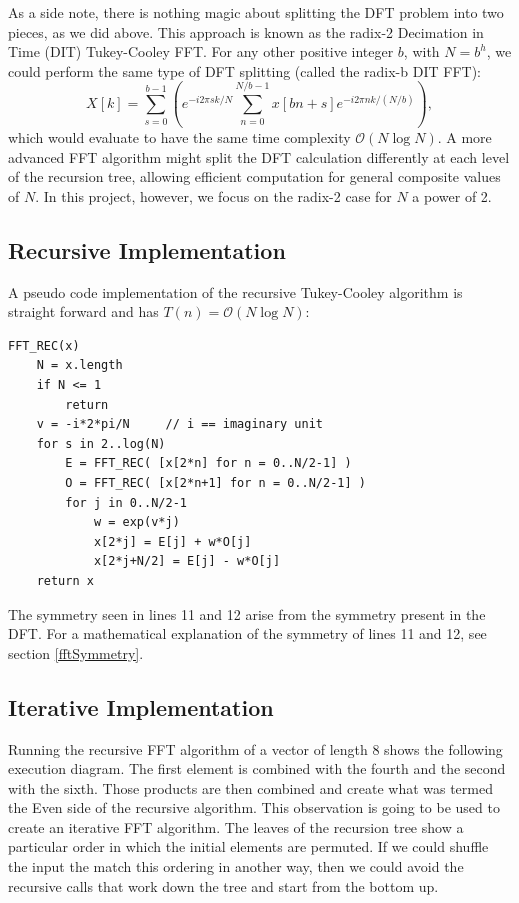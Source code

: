 As a side note, there is nothing magic about splitting the DFT problem into two pieces, as we did above. This approach is known as the radix-2 Decimation in Time (DIT) Tukey-Cooley FFT. For any other positive integer $b$, with $N = b^h$, we could perform the same type of DFT splitting (called the radix-b DIT FFT):
\[
X[k] = \sum_{s=0}^{b-1} \left( e^{-i2\pi s k/N}\sum_{n=0}^{N/b-1}x[bn+s]e^{-i2\pi n k /(N/b)} \right),
\]
which would evaluate to have the same time complexity $\mathcal{O}(N\log N)$. A more advanced FFT algorithm might split the DFT calculation differently at each level of the recursion tree, allowing efficient computation for general composite values of $N$. In this project, however, we focus on the radix-2 case for $N$ a power of 2.

\subsection{Recursive Implementation}
\label{fftRecursive}
A pseudo code implementation of the recursive Tukey-Cooley algorithm is straight forward and has $T(n) = \mathcal{O}(N \log N)$:
\pagebreak
\begin{lstlisting}
FFT_REC(x)
    N = x.length
    if N <= 1
        return
    v = -i*2*pi/N     // i == imaginary unit
    for s in 2..log(N)
        E = FFT_REC( [x[2*n] for n = 0..N/2-1] )
        O = FFT_REC( [x[2*n+1] for n = 0..N/2-1] )
        for j in 0..N/2-1
            w = exp(v*j)
            x[2*j] = E[j] + w*O[j]
            x[2*j+N/2] = E[j] - w*O[j]
    return x
\end{lstlisting}

The symmetry seen in lines 11 and 12 arise from the symmetry present in the DFT. For a mathematical explanation of the symmetry of lines 11 and 12, see section \ref{fftSymmetry}. 


\subsection{Iterative Implementation}
Running the recursive FFT algorithm of a vector of length 8 shows the following execution diagram. The first element is combined with the fourth and the second with the sixth. Those products are then combined and create what was termed the Even side of the recursive algorithm. This observation is going to be used to create an iterative FFT algorithm. The leaves of the recursion tree show a particular order in which the initial elements are permuted. If we could shuffle the input the match this ordering in another way, then we could avoid the recursive calls that work down the tree and start from the bottom up.


